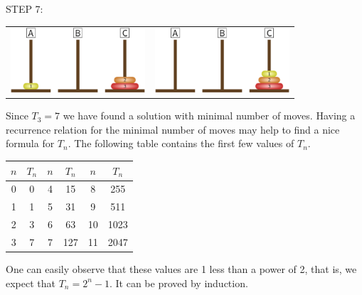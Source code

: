 STEP 7:
\begin{center}
\begin{tabular}{l|r}
\includegraphics[width=50mm]{./H37-1}
&
\includegraphics[width=50mm]{./H38-1}
\end{tabular}
\end{center}
Since $T_3=7$ we have found a solution with minimal number of moves.
Having a recurrence relation for the minimal number of moves may help to 
find a nice formula for $T_n$.
The following table contains the first few values of $T_n$.
\begin{center}
\begin{tabular}{|c|c||c|c||c|c|}
\hline
$n$ & $T_n$ & $n$ & $T_n$ & $n$ & $T_n$\\
\hline
0 & 0 & 4 & 15 & 8 & 255\\
\hline
1 & 1 & 5 & 31 & 9 & 511\\
\hline
2 & 3 & 6 & 63 & 10 & 1023\\
\hline
3 & 7 & 7 & 127 & 11 & 2047\\
\hline
\end{tabular}
\end{center}
One can easily observe that these values are 1 less than a power of 2, that is, 
we expect that $T_n=2^n-1$. It can be proved by induction.

